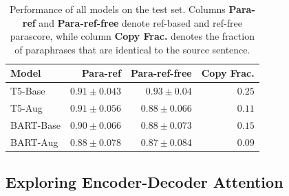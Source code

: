 \documentclass[fleqn,moreauthors,10pt]{ds_report}
\begin{document}


\begin{table}[!h]
\centering
\caption{Performance of all models on the test set. Columns \textbf{Para-ref} and \textbf{Para-ref-free} denote ref-based and ref-free parascore, while column \textbf{Copy Frac.} denotes the fraction of paraphrases that are identical to the source sentence.}
\begin{tabular}{lrrr}
\textbf{Model} & \textbf{Para-ref} & \textbf{Para-ref-free} & \textbf{Copy Frac.}\\ \hline
T5-Base & $0.91 \pm 0.043$ & $0.93 \pm 0.04$ & $0.25$ \\
T5-Aug & $0.91 \pm 0.056$ & $0.88 \pm 0.066$ & $0.11$ \\
BART-Base & $0.90 \pm 0.066$ & $0.88 \pm 0.073$ & $0.15$ \\
BART-Aug & $0.88 \pm 0.078$ & $0.87 \pm 0.084$ & $0.09$ \\ \hline
\end{tabular}
\label{tab:models-performance}
\end{table}


\subsection{Exploring Encoder-Decoder Attention}
\end{document}
